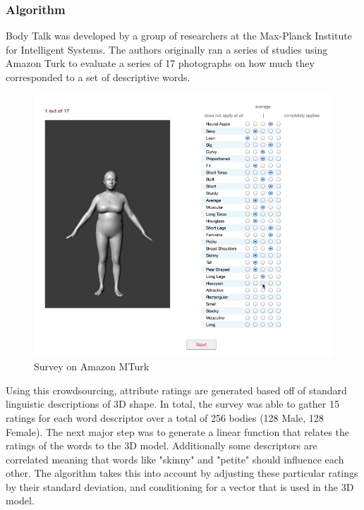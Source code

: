 \documentclass[journal]{vgtc}                %
\begin{document}
\subsubsection{Algorithm}
\noindent Body Talk was developed by a group of researchers at the Max-Planck Institute for Intelligent Systems. The authors originally ran a series
of studies using Amazon Turk to evaluate a series of 17 photographs on how much they corresponded to a set of descriptive words. \
\begin{figure}[!htb]
	\includegraphics[width=\columnwidth]{survey}
	\caption{Survey on Amazon MTurk}
\end{figure}
Using this crowdsourcing, attribute ratings are generated based off of standard linguistic descriptions of 3D shape. In total, the
survey was able to gather 15 ratings for each word descriptor over a total of 256 bodies (128 Male, 128 Female). The next major step was
to generate a linear function that relates the ratings of the words to the 3D model. Additionally some descriptors are correlated
meaning that words like "skinny" and "petite" should influence each other. The algorithm takes this into account by adjusting these
particular ratings by their standard deviation, and conditioning for a vector that is used in the 3D model.
\end{document}

